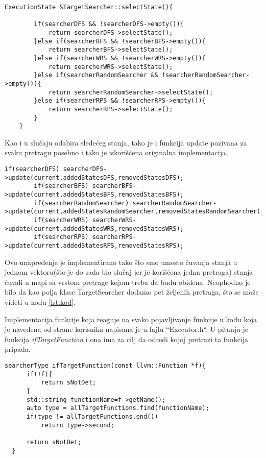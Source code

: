 \documentclass[a4paper]{article}
\begin{document}
\newpage
\begin{lstlisting}[title={Odabir sledećeg stanja}]
    ExecutionState &TargetSearcher::selectState(){

        if(searcherDFS && !searcherDFS->empty()){
            return searcherDFS->selectState();
        }else if(searcherBFS && !searcherBFS->empty()){
            return searcherBFS->selectState();
        }else if(searcherWRS && !searcherWRS->empty()){
            return searcherWRS->selectState();
        }else if(searcherRandomSearcher && !searcherRandomSearcher->empty()){
            return searcherRandomSearcher->selectState();
        }else if(searcherRPS && !searcherRPS->empty()){
            return searcherRPS->selectState();
        }
    }
\end{lstlisting}
Kao i u slučaju odabira sledećeg stanja, tako je i funkcija update pozivana za svaku pretragu posebno i tako je iskorišćena originalna implementacija.
\begin{lstlisting}[title={Update funkcija}]
        if(searcherDFS) searcherDFS->update(current,addedStatesDFS,removedStatesDFS);
        if(searcherBFS) searcherBFS->update(current,addedStatesBFS,removedStatesBFS);
        if(searcherRandomSearcher) searcherRandomSearcher->update(current,addedStatesRandomSearcher,removedStatesRandomSearcher);
        if(searcherWRS) searcherWRS->update(current,addedStatesWRS,removedStatesWRS);
        if(searcherRPS) searcherRPS->update(current,addedStatesRPS,removedStatesRPS);
\end{lstlisting}

Ovo unapređenje je implementirano tako što smo umesto čuvanja stanja u jednom vektoru(što je do sada bio slučaj jer je korišćena jedna pretraga) stanja čuvali u mapi sa vrstom pretrage kojom treba da budu obiđena. Neophodno je bilo da kao polja klase TargetSearcher dodamo pet željenih pretraga, što se može videti u kodu \ref{lst:kod}. 

Implementacija funkcije koja reaguje na svako pojavljivanje funkcije u kodu koja je navedena od strane korisnika napisana je u fajlu ``Executor.h``. U pitanju je funkcija \textit{ifTargetFunction} i ona ima za cilj da odredi kojoj pretrazi ta funkcija pripada.
\begin{lstlisting}[title={Provera kojoj pretrazi funkcija treba da pripada}]
   searcherType ifTargetFunction(const llvm::Function *f){
      if(!f){
		  return sNotDet;
	  }
	  std::string functionName=f->getName();
      auto type = allTargetFunctions.find(functionName);
      if(type != allTargetFunctions.end())
          return type->second;
      
      return sNotDet;
  }
\end{lstlisting}
\end{document}
